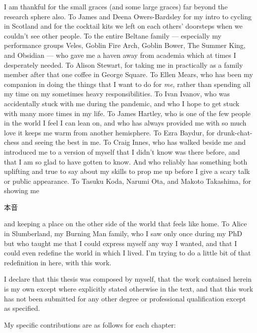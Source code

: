 \documentclass[phd,ilcc,oneside,leftchapter,parskip]{infthesis}
\begin{document}
\begin{preliminary}
\begin{acknowledgements}
I am thankful for the small graces (and some large graces) far beyond the research sphere also. To James and Deena Owers-Bardsley for my intro to cycling in Scotland and for the cocktail kits we left on each others' doorsteps when we couldn't see other people. To the entire Beltane family --- especially my performance groups Veles, Goblin Fire Arch, Goblin Bower, The Summer King, and Obsidian --- who gave me a haven away from academia which at times I desperately needed. To Alison Stewart, for taking me in practically as a family member after that one coffee in George Square. To Ellen Mears, who has been my companion in doing the things that I want to do for \textit{me}, rather than spending all my time on my sometimes heavy responsibilities. To Ivan Ivanov, who was accidentally stuck with me during the pandemic, and who I hope to get stuck with many more times in my life. To James Hartley, who is one of the few people in the world I feel I can lean on, and who has always provided me with so much love it keeps me warm from another hemisphere. To Ezra Baydur, for drunk-chat-chess and seeing the best in me. To Craig Innes, who has walked beside me and introduced me to a version of myself that I didn't know was there before, and that I am so glad to have gotten to know. And who reliably has something both uplifting and true to say about my skills to prop me up before I give a scary talk or public appearance. To Tasuku Koda, Narumi Ota, and Makoto Takashima, for showing me \begin{CJK*}{UTF8}{ipxm} 本音 \end{CJK*} and keeping a place on the other side of the world that feels like home. To Alice in Slumberland, my Burning Man family, who I saw only once during my PhD but who taught me that I could express myself any way I wanted, and that I could even redefine the world in which I lived. I'm trying to do a little bit of that redefinition in here, with this work. 

\end{acknowledgements}


\begin{declaration}
   I declare that this thesis was composed by myself,
   that the work contained herein is my own 
   except where explicitly stated otherwise in the text,
   and that this work has not been submitted for any other degree or
   professional qualification except as specified.

   My specific contributions are as follows for each chapter:
   

\end{declaration}
\end{preliminary}
\end{document}
